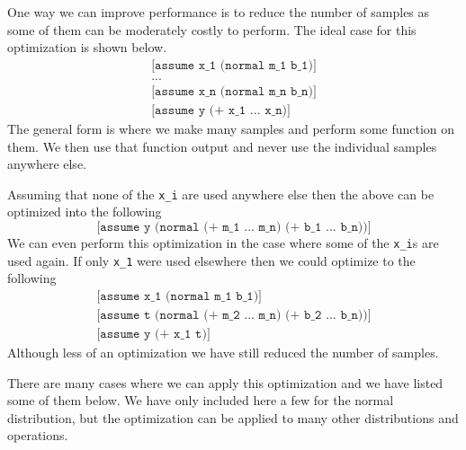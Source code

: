 \documentclass[a4paper]{article}
\begin{document}
One way we can improve performance is to reduce the number of samples as some of them can be moderately costly to perform. The ideal case for this optimization is shown below.
\[
	\begin{array}{l}
		\texttt{[assume x\_1 (normal m\_1 b\_1)]} \\
		\texttt{...} \\
		\texttt{[assume x\_n (normal m\_n b\_n)]} \\
		\texttt{[assume y (+ x\_1 ...\ x\_n)]}
	\end{array}
\]
The general form is where we make many samples and perform some function on them. We then use that function output and never use the individual samples anywhere else.

Assuming that none of the \texttt{x\_i} are used anywhere else then the above can be optimized into the following
\[
	\texttt{[assume y (normal (+ m\_1 ...\ m\_n) (+ b\_1 ...\ b\_n))]}
\]
We can even perform this optimization in the case where some of the \texttt{x\_i}s are used again. If only \texttt{x\_1} were used elsewhere then we could optimize to the following
\[
	\begin{array}{l}
		\texttt{[assume x\_1 (normal m\_1 b\_1)]} \\
		\texttt{[assume t (normal (+ m\_2 ...\ m\_n) (+ b\_2 ...\ b\_n))]} \\
		\texttt{[assume y (+ x\_1 t)]}
	\end{array}
\]
Although less of an optimization we have still reduced the number of samples.

There are many cases where we can apply this optimization and we have listed some of them below. We have only included here a few for the normal distribution, but the optimization can be applied to many other distributions and operations.
\end{document}
